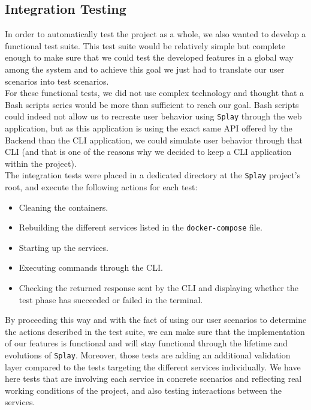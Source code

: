 \documentclass{eplmastersthesis}
\begin{document}
      \subsection{Integration Testing}

        In order to automatically test the project as a whole, we also wanted to
        develop a functional test suite. This test suite would be relatively
        simple but complete enough to make sure that we could test the developed
        features in a global way among the system and to achieve this goal we
        just had to translate our user scenarios into test scenarios.\\

        For these functional tests, we did not use complex technology and
        thought that a Bash scripts series would be more than sufficient to
        reach our goal. Bash scripts could indeed not allow us to recreate user
        behavior using \texttt{Splay} through the web application, but as this
        application is using the exact same API offered by the Backend than the
        CLI application, we could simulate user behavior through that CLI (and
        that is one of the reasons why we decided to keep a CLI application
        within the project).\\

        The integration tests were placed in a dedicated directory at the \texttt{Splay}
        project's root, and execute the following actions for each test:

        \begin{itemize}
          \item Cleaning the containers.
          \item Rebuilding the different services listed in the \texttt{docker-compose}
          file.
          \item Starting up the services.
          \item Executing commands through the CLI.
          \item Checking the returned response sent by the CLI and displaying
          whether the test phase has succeeded or failed in the terminal.
        \end{itemize}

        By proceeding this way and with the fact of using our user scenarios to
        determine the actions described in the test suite, we can make sure
        that the implementation of our features is functional and will stay
        functional through the lifetime and evolutions of \texttt{Splay}. Moreover, those
        tests are adding an additional validation layer compared to the tests
        targeting the different services individually. We have here tests that
        are involving each service in concrete scenarios and reflecting real
        working conditions of the project, and also testing interactions
        between the services.
\end{document}
